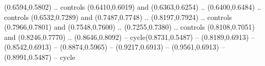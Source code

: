 {(0.6594,0.5802) .. controls (0.6410,0.6019) and (0.6363,0.6254) .. (0.6400,0.6484) .. controls (0.6532,0.7289) and (0.7487,0.7748) .. (0.8197,0.7924) .. controls (0.7966,0.7801) and (0.7548,0.7600) .. (0.7255,0.7380) .. controls (0.8108,0.7051) and (0.8246,0.7770) .. (0.8646,0.8092) -- cycle(0.8731,0.5487) -- (0.8189,0.6913) -- (0.8542,0.6913) -- (0.8874,0.5965) -- (0.9217,0.6913) -- (0.9561,0.6913) -- (0.8991,0.5487) -- cycle
}

%
%

\def\picduck{%
  \qbezier(6.5,29.5)(-1,17.5)(16.8,27.3)
  \qbezier(6.5,29.5)(9,30.5)(11.4,28.0)
  \qbezier(11.4,28.0)(13.5,26.5)(16.8,27.3)
  \qbezier(06.5,29.5)(6,41.5)(16.8,42.4)
  \qbezier(16.8,42.4)(29,41)(25.3,24)
  \qbezier(7.8,23.2)(8,22.8)(8,22.5)
  \qbezier(8,22.5)(-5,9)(8,3)
  \qbezier(8,3)(22,-2)(35,6.5)
  \qbezier(35,6.5)(46,15)(35,28.3)
  \qbezier(35,28.3)(30,25)(25.3,24)
  \qbezier(13,32)(13.8,34.5)(16,34)
  \qbezier(16,34)(17.3,33.2)(16.7,31)
  \qbezier(16.7,31)(16,29.1)(14.5,29.3)
  \qbezier(14.5,29.3)(12.7,29.5)(13,32)
  \put(15.3,31.3){\circle*{1.8}}
  \qbezier(7.7,33.2)(8.4,35.7)(10.3,35)
  \qbezier(10.3,35)(11.2,34)(10.4,32.2)
  \qbezier(10.4,32.2)(9.7,30.7)(8.7,30.7)
  \qbezier(8.7,30.7)(7.2,30.9)(7.7,33.2)
  \put(9.5,32.7){\circle*{1.5}}
}

